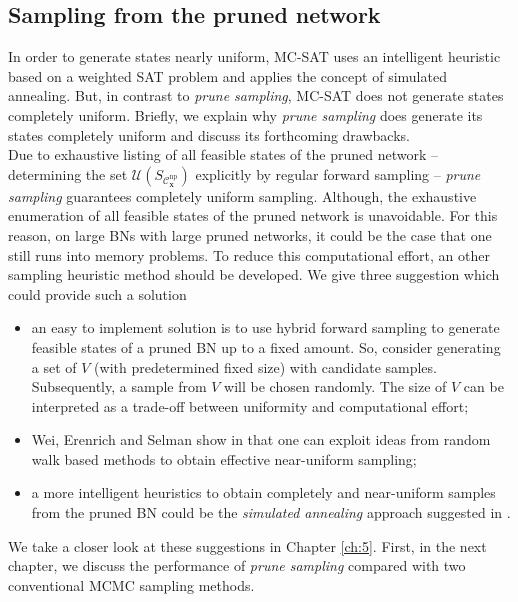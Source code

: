 \documentclass[a4paper, twoside, 11pt]{report}
\newcommand{\bfx}{{\mathbf{x}}}
\newcommand{\C}{{\mathcal C}}
\newcommand{\U}{{\mathcal{U}}}
\theoremstyle{plain}
\theoremstyle{definition}
\theoremstyle{remark}
\newcommand{\ps}{\textit{prune sampling }}
\begin{document}
\subsection{Sampling from the pruned network}\label{sec:sampling_uni}
In order to generate states nearly uniform, MC-SAT uses an intelligent heuristic \cite{wei2004towards} based on a weighted SAT problem and applies the concept of simulated annealing. But, in contrast to \textit{prune sampling}, MC-SAT does not generate states completely uniform. Briefly, we explain why \ps does generate its states completely uniform and discuss its forthcoming drawbacks.\\

Due to exhaustive listing of all feasible states of the pruned network -- determining the set $\U(S_{\C_\bfx^{\text{np}}})$ explicitly by regular forward sampling -- \ps guarantees completely uniform sampling. Although, the exhaustive enumeration of all feasible states of the pruned network is unavoidable. For this reason, on large BNs with large pruned networks, it could be the case that one still runs into memory problems. To reduce this computational effort, an other sampling heuristic method should be developed. We give three suggestion which could provide such a solution
\begin{itemize}
\item an easy to implement solution is to use hybrid forward sampling to generate feasible states of a pruned BN up to a fixed amount. So, consider generating a set of $V$ (with predetermined fixed size) with candidate samples. Subsequently, a sample from $V$ will be chosen randomly. The size of $V$ can be interpreted as a trade-off between uniformity and computational effort;
\item Wei, Erenrich and Selman show in \cite{wei2004towards} that one can exploit ideas from random walk based methods to obtain effective near-uniform sampling;
\item a more intelligent heuristics to obtain completely and near-uniform samples from the pruned BN could be the \textit{simulated annealing} approach suggested in \cite{wei2004towards}.
\end{itemize}
We take a closer look at these suggestions in Chapter \ref{ch:5}. First, in the next chapter, we discuss the performance of \ps compared with two conventional MCMC sampling methods.

\end{document}
